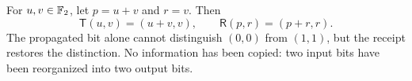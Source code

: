 \setcounter{theorem}{1}
\begin{example}
For $u,v\in\mathbb F_2$, let $p=u+v$ and $r=v$. Then
\[
\mathsf T(u,v)=(u+v,v),\qquad \mathsf R(p,r)=(p+r,r).
\]
The propagated bit alone cannot distinguish $(0,0)$ from $(1,1)$, but the receipt restores the distinction. No information has been copied: two input bits have been reorganized into two output bits.
\end{example}

